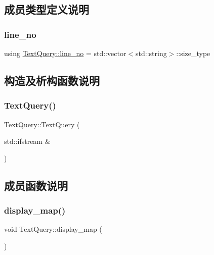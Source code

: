 \subsection{成员类型定义说明}
\mbox{\label{classTextQuery_a504c1be8d67d4fcf4c205999e2377262}} 
\subsubsection{\texorpdfstring{line\+\_\+no}{line\_no}}
{\footnotesize\ttfamily using \hyperlink{classTextQuery_a504c1be8d67d4fcf4c205999e2377262}{Text\+Query\+::line\+\_\+no} =  std\+::vector$<$std\+::string$>$\+::size\+\_\+type}



\subsection{构造及析构函数说明}
\mbox{\label{classTextQuery_a7362fe39ff27f72b5aa4127459318606}} 
\subsubsection{\texorpdfstring{Text\+Query()}{TextQuery()}}
{\footnotesize\ttfamily Text\+Query\+::\+Text\+Query (\begin{DoxyParamCaption}\item[{std\+::ifstream \&}]{ }\end{DoxyParamCaption})}



\subsection{成员函数说明}
\mbox{\label{classTextQuery_a481824aee58568ba51455e3131f479dd}} 
\subsubsection{\texorpdfstring{display\+\_\+map()}{display\_map()}}
{\footnotesize\ttfamily void Text\+Query\+::display\+\_\+map (\begin{DoxyParamCaption}{ }\end{DoxyParamCaption})}

